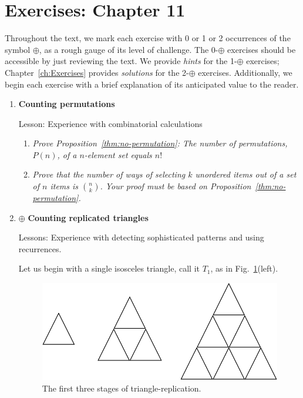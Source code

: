 \section{Exercises: Chapter 11}

Throughout the text, we mark each exercise with 0 or 1 or 2 occurrences of the symbol $\oplus$, as a rough gauge of its level of challenge.  The 0-$\oplus$ exercises should be accessible by just reviewing the text.  We provide {\em hints} for the 1-$\oplus$ exercises; Chapter~\ref{ch:Exercises} provides {\em solutions} for the 2-$\oplus$ exercises.  Additionally, we begin each exercise with a brief explanation of its anticipated value to the reader.

\begin{enumerate}
\item
{\bf Counting permutations}

{\sc Lesson:} Experience with combinatorial calculations

  \begin{enumerate}
  \item
{\em Prove Proposition~\ref{thm:no-permutation}:
The number of permutations, $P(n)$, of a $n$-element set equals $n!$}

  \medskip\item
{\em Prove that the number of ways of selecting $k$ unordered items out of a set of $n$ items is $\displaystyle {n \choose k}$.  Your proof must be based on Proposition~\ref{thm:no-permutation}.}
  \end{enumerate}

\medskip\item
$\oplus$
{\bf Counting replicated triangles}

{\sc Lessons:} Experience with detecting sophisticated patterns and using recurrences.

\smallskip

Let us begin with a single isosceles triangle, call it $T_1$, as in Fig.~\ref{fig:countingTriangles}(left).
\begin{figure}[h]
\begin{center}
        \includegraphics[scale=0.35]{FiguresArithmetic/CountingTriangles}
        \caption{The first three stages of triangle-replication.}
        \label{fig:countingTriangles}
\end{center}
\end{figure}


\end{enumerate}
